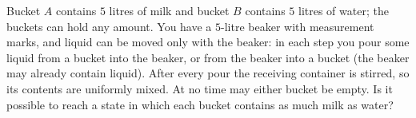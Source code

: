 Bucket $A$ contains $5$ litres of milk and bucket $B$ contains $5$ litres of water; the buckets can hold any amount. You have a $5$-litre beaker with measurement marks, and liquid can be moved only with the beaker: in each step you pour some liquid from a bucket into the beaker, or from the beaker into a bucket (the beaker may already contain liquid). After every pour the receiving container is stirred, so its contents are uniformly mixed. At no time may either bucket be empty. Is it possible to reach a state in which each bucket contains as much milk as water?
